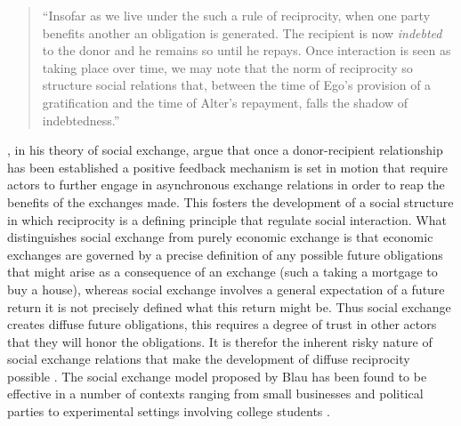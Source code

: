 \begin{quote}
  ``Insofar as we live under the such a rule of reciprocity, when one party benefits another an obligation is generated. The recipient is now \textsl{indebted} to the donor and he remains so until he repays. Once interaction is seen as taking place over time, we may note that the norm of reciprocity so structure social relations that, between  the time of Ego's provision of a gratification and the time of Alter's repayment, falls the shadow of indebtedness.''
\end{quote}

\citet{Blau1964}, in his theory of social exchange, argue that once a donor-recipient relationship has been established a positive feedback mechanism is set in motion that require actors to further engage in asynchronous exchange relations in order to reap the benefits of the exchanges made. This fosters the development of a social structure in which reciprocity is a defining principle that regulate social interaction. What distinguishes social exchange from purely economic exchange is that economic exchanges are governed by a precise definition of any possible future obligations that might arise as a consequence of an exchange (such a taking a mortgage to buy a house), whereas social exchange involves a general expectation of a future return it is not precisely defined what this return might be. Thus social exchange creates diffuse future obligations, this requires a degree of trust in other actors that they will honor the obligations. It is therefor the inherent risky nature of social exchange relations that make the development of diffuse reciprocity possible \citep[94]{Blau1964}. The social exchange model proposed by Blau has been found to be effective in a number of contexts ranging from small businesses and political parties to experimental settings involving college students \citetext{for an overview see \citealt{CropanzanoMitchell2005}}.  

